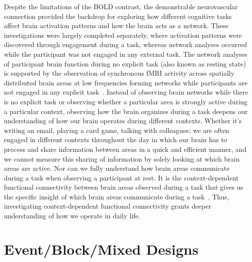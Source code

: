 \documentclass[phd,figures,tables,ackpage,abstractpage,publicabstractpage]{uithesis}
\begin{document}
Despite the limitations of the BOLD contrast, the demonstrable neurovascular 
connection provided the backdrop for exploring how different
cognitive tasks affect brain activation patterns and how the brain acts as a
network.
These investigations were largely completed separately, where activation patterns
were discovered through engagement during a task, whereas network analyses
occurred while the participant was not engaged in any external task.
The network analyses of participant brain function during no explicit task
(also known as resting state) is supported by the observation of synchronous fMRI activity
across spatially distributed brain areas at low frequencies forming networks while
participants are not engaged in any explicit task~\cite{Greicius2003,Raichle2009}.
Instead of observing brain networks while there is no explicit task or observing
whether a particular area is strongly active during a particular context,
observing how the brain organizes during a task deepens our understanding of how
our brain operates during different contexts.
Whether it's writing an email, playing a card game, talking with colleagues; we are
often engaged in different contexts throughout the day in which our brain has to process
and share information between areas in a quick and efficient manner, and we cannot
measure this sharing of information by solely looking at which brain areas are active.
Nor can we fully understand how brain areas communicate during a task when observing a
participant at rest.
It is the context-dependent functional connectivity between brain areas observed during a task
that gives us the specific insight of which brain areas communicate during a task~\cite{Friston1997}.
Thus, investigating context-dependent functional connectivity grants deeper understanding
of how we operate in daily life.

\section{Event/Block/Mixed Designs}
\end{document}
